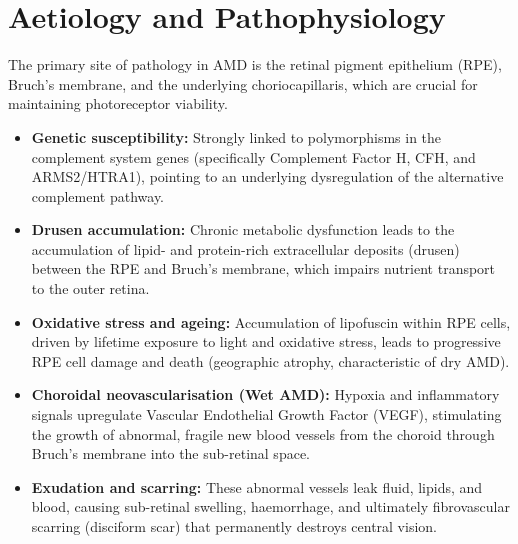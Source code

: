 \section*{Aetiology and Pathophysiology}
The primary site of pathology in AMD is the retinal pigment epithelium (RPE), Bruch's membrane, and the underlying choriocapillaris, which are crucial for maintaining photoreceptor viability.
\begin{itemize}
    \item \textbf{Genetic susceptibility:} Strongly linked to polymorphisms in the complement system genes (specifically Complement Factor H, CFH, and ARMS2/HTRA1), pointing to an underlying dysregulation of the alternative complement pathway.
    \item \textbf{Drusen accumulation:} Chronic metabolic dysfunction leads to the accumulation of lipid- and protein-rich extracellular deposits (drusen) between the RPE and Bruch's membrane, which impairs nutrient transport to the outer retina.
    \item \textbf{Oxidative stress and ageing:} Accumulation of lipofuscin within RPE cells, driven by lifetime exposure to light and oxidative stress, leads to progressive RPE cell damage and death (geographic atrophy, characteristic of dry AMD).
    \item \textbf{Choroidal neovascularisation (Wet AMD):} Hypoxia and inflammatory signals upregulate Vascular Endothelial Growth Factor (VEGF), stimulating the growth of abnormal, fragile new blood vessels from the choroid through Bruch's membrane into the sub-retinal space.
    \item \textbf{Exudation and scarring:} These abnormal vessels leak fluid, lipids, and blood, causing sub-retinal swelling, haemorrhage, and ultimately fibrovascular scarring (disciform scar) that permanently destroys central vision.
\end{itemize}

